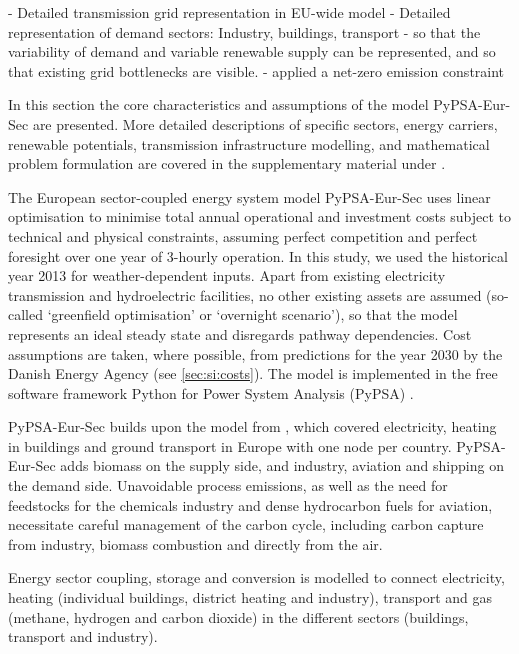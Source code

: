 - Detailed transmission grid representation in EU-wide model
- Detailed representation of demand sectors: Industry, buildings, transport
- so that the variability of demand and variable renewable supply can be represented, and so that existing grid bottlenecks are visible.
- applied a net-zero emission constraint

In this section the core characteristics and assumptions of the model
PyPSA-Eur-Sec are presented. More detailed descriptions of specific sectors,
energy carriers, renewable potentials, transmission infrastructure modelling,
and mathematical problem formulation are covered in the supplementary material
under .

The European sector-coupled energy system model PyPSA-Eur-Sec uses linear
optimisation to minimise total annual operational and investment costs subject
to technical and physical constraints, assuming perfect competition and perfect
foresight over one year of 3-hourly operation. In this study, we used the
historical year 2013 for weather-dependent inputs. Apart from existing
electricity transmission and hydroelectric facilities, no other existing assets
are assumed (so-called `greenfield optimisation' or `overnight scenario'), so
that the model represents an ideal steady state and disregards pathway
dependencies.  Cost assumptions are taken, where possible, from predictions for
the year 2030 by the Danish Energy Agency \cite{dea2019} (see
\cref{sec:si:costs}). The model is implemented in the free software framework
Python for Power System Analysis (PyPSA) \cite{brownPyPSAPython2018}.

PyPSA-Eur-Sec builds upon the model from \cite{brownSynergiesSector2018}, which
covered electricity, heating in buildings and ground transport in Europe with
one node per country. PyPSA-Eur-Sec adds biomass on the supply side, and
industry, aviation and shipping on the demand side. Unavoidable process
emissions, as well as the need for feedstocks for the chemicals industry and
dense hydrocarbon fuels for aviation, necessitate careful management of the
carbon cycle, including carbon capture from industry, biomass combustion and
directly from the air.

Energy sector coupling, storage and conversion is modelled to connect
electricity, heating (individual buildings, district heating and industry),
transport and gas (methane, hydrogen and carbon dioxide) in the different
sectors (buildings, transport and industry).

